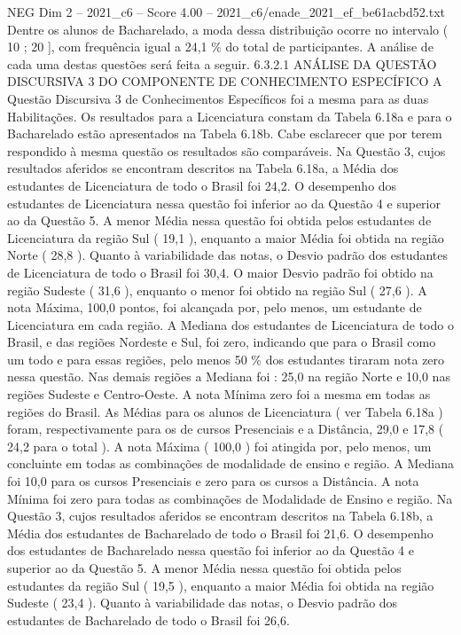 \begin{textsample}{NEG Dim 2 – 2021\_c6 – Score 4.00 – 2021\_c6/enade\_2021\_ef\_be61acbd52.txt}
Dentre os alunos de Bacharelado, a moda dessa distribuição ocorre no intervalo ( 10 ; 20 ], com frequência igual a 24,1 \% do total de participantes.
A análise de cada uma destas questões será feita a seguir. 6.3.2.1 ANÁLISE DA QUESTÃO DISCURSIVA 3 DO COMPONENTE DE CONHECIMENTO ESPECÍFICO A Questão Discursiva 3 de Conhecimentos Específicos foi a mesma para as duas Habilitações.
Os resultados para a Licenciatura constam da Tabela 6.18a e para o Bacharelado estão apresentados na Tabela 6.18b.
Cabe esclarecer que por terem respondido à mesma questão os resultados são comparáveis.
Na Questão 3, cujos resultados aferidos se encontram descritos na Tabela 6.18a, a Média dos estudantes de Licenciatura de todo o Brasil foi 24,2.
O desempenho dos estudantes de Licenciatura nessa questão foi inferior ao da Questão 4 e superior ao da Questão 5.
A menor Média nessa questão foi obtida pelos estudantes de Licenciatura da região Sul ( 19,1 ), enquanto a maior Média foi obtida na região Norte ( 28,8 ).
Quanto à variabilidade das notas, o Desvio padrão dos estudantes de Licenciatura de todo o Brasil foi 30,4.
O maior Desvio padrão foi obtido na região Sudeste ( 31,6 ), enquanto o menor foi obtido na região Sul ( 27,6 ).
A nota Máxima, 100,0 pontos, foi alcançada por, pelo menos, um estudante de Licenciatura em cada região.
A Mediana dos estudantes de Licenciatura de todo o Brasil, e das regiões Nordeste e Sul, foi zero, indicando que para o Brasil como um todo e para essas regiões, pelo menos 50 \% dos estudantes tiraram nota zero nessa questão.
Nas demais regiões a Mediana foi : 25,0 na região Norte e 10,0 nas regiões Sudeste e Centro-Oeste.
A nota Mínima zero foi a mesma em todas as regiões do Brasil.
As Médias para os alunos de Licenciatura ( ver Tabela 6.18a ) foram, respectivamente para os de cursos Presenciais e a Distância, 29,0 e 17,8 ( 24,2 para o total ).
A nota Máxima ( 100,0 ) foi atingida por, pelo menos, um concluinte em todas as combinações de modalidade de ensino e região.
A Mediana foi 10,0 para os cursos Presenciais e zero para os cursos a Distância.
A nota Mínima foi zero para todas as combinações de Modalidade de Ensino e região.
Na Questão 3, cujos resultados aferidos se encontram descritos na Tabela 6.18b, a Média dos estudantes de Bacharelado de todo o Brasil foi 21,6.
O desempenho dos estudantes de Bacharelado nessa questão foi inferior ao da Questão 4 e superior ao da Questão 5.
A menor Média nessa questão foi obtida pelos estudantes da região Sul ( 19,5 ), enquanto a maior Média foi obtida na região Sudeste ( 23,4 ).
Quanto à variabilidade das notas, o Desvio padrão dos estudantes de Bacharelado de todo o Brasil foi 26,6.

\end{textsample}
